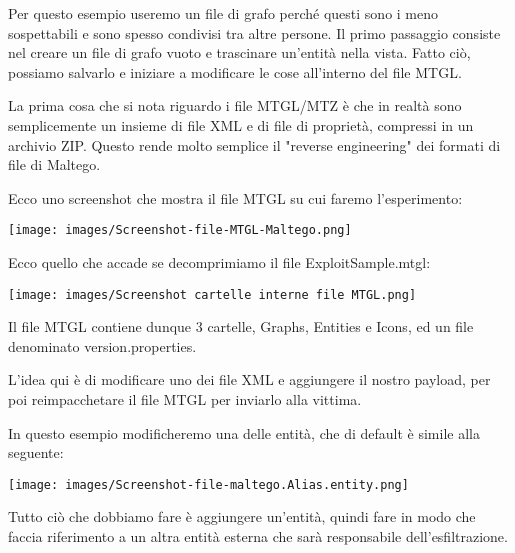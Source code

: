\begin{flushleft}
Per questo esempio useremo un file di grafo perché questi sono i meno sospettabili e sono spesso condivisi tra altre persone. Il primo passaggio consiste nel creare un file di grafo vuoto e trascinare un'entità nella vista. Fatto ciò, possiamo salvarlo e iniziare a modificare le cose all'interno del file MTGL.
\end{flushleft}

\begin{flushleft}
La prima cosa che si nota riguardo i file MTGL/MTZ è che in realtà sono semplicemente un insieme di file XML e di file di proprietà, compressi in un archivio ZIP. Questo rende molto semplice il "reverse engineering" dei formati di file di Maltego.
\end{flushleft}

\begin{flushleft}
Ecco uno screenshot che mostra il file MTGL su cui faremo l'esperimento:

\texttt{[image: images/Screenshot-file-MTGL-Maltego.png]}
\end{flushleft}

\begin{flushleft}
Ecco quello che accade se decomprimiamo il file ExploitSample.mtgl:

\texttt{[image: images/Screenshot cartelle interne file MTGL.png]}
\end{flushleft}

\begin{flushleft}
Il file MTGL contiene dunque 3 cartelle, Graphs, Entities e Icons, ed un file denominato version.properties.
\end{flushleft}

\begin{flushleft}
L'idea qui è di modificare uno dei file XML e aggiungere il nostro payload, per poi reimpacchetare il file MTGL per inviarlo alla vittima.
\end{flushleft}

\begin{flushleft}
In questo esempio modificheremo una delle entità, che di default è simile alla seguente:
\end{flushleft}

\texttt{[image: images/Screenshot-file-maltego.Alias.entity.png]}

\begin{flushleft}
Tutto ciò che dobbiamo fare è aggiungere un'entità, quindi fare in modo che faccia riferimento a un altra entità esterna che sarà responsabile dell'esfiltrazione.
\end{flushleft}

